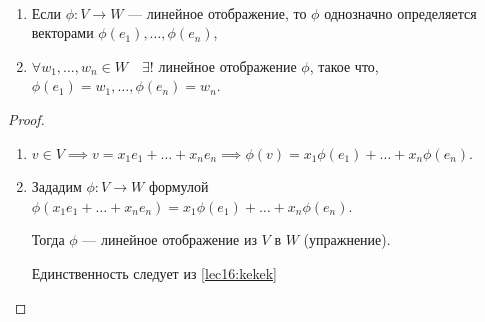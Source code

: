 \begin{proposal}~
    \begin{enumerate}
    \item Если $\phi : V \to W$ --- линейное отображение, то $\phi$ однозначно определяется векторами $\phi(e_1), \dots, \phi(e_n)$,
    \item $\forall w_1, \dots, w_n \in W \quad \exists!$ линейное отображение $\phi$, такое что, $\phi(e_1) = w_1, \dots, \phi(e_n) = w_n$.
    \end{enumerate}
\end{proposal}

\begin{proof}~
    \begin{enumerate}
    \item \label{lec16:kekek}
        $v \in V \implies v = x_1 e_1 + \dots + x_n e_n \implies \phi(v) = x_1 \phi(e_1) + \dots + x_n \phi(e_n)$.
    \item 
        Зададим $\phi : V \to W$ формулой $\phi(x_1 e_1 + \dots + x_n e_n) = x_1 \phi(e_1) + \dots + x_n \phi(e_n)$.

        Тогда $\phi$ --- линейное отображение из $V$ в $W$ (упражнение).

        Единственность следует из \ref{lec16:kekek}
        \qedhere
    \end{enumerate}
\end{proof}
